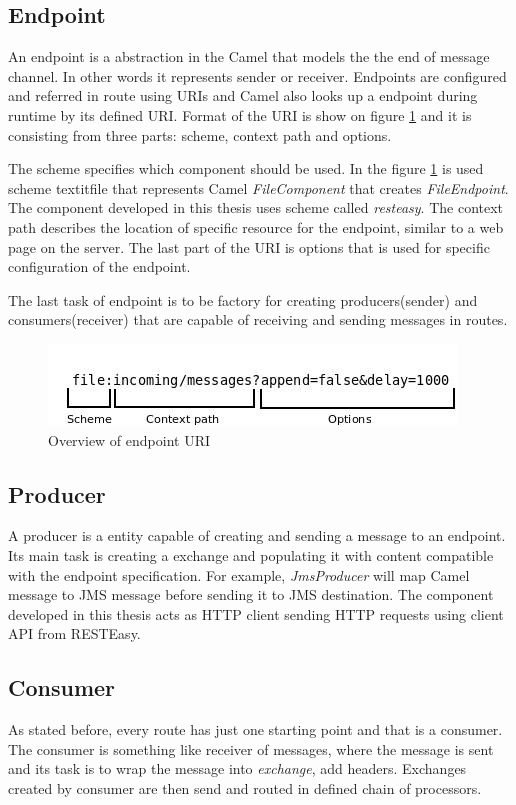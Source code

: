 \documentclass[12pt,final,oneside]{fithesis2}
\begin{document}
\subsection*{Endpoint}
An endpoint is a abstraction in the Camel that models the the end of message channel. In other words it represents sender or receiver. Endpoints are configured and referred in route using URIs and Camel also looks up a endpoint during runtime by its defined URI. Format of the URI is show on figure \ref{uri} and it is consisting from three parts: scheme, context path and options. 

The scheme specifies which component should be used. In the figure \ref{uri} is used scheme textit{file} that represents Camel \textit{FileComponent} that creates \textit{FileEndpoint}. The component developed in this thesis uses scheme called \textit{resteasy}. The context path describes the location of specific resource for the endpoint, similar to a web page on the server. The last part of the URI is options that is used for specific configuration of the endpoint.

The last task of endpoint is to be factory for creating producers(sender) and consumers(receiver) that are capable of receiving and sending messages in routes.

\begin{figure}
\centering
\includegraphics[width=0.9\linewidth]{sources/Diagram1.jpeg}
\caption{Overview of endpoint URI}
\label{uri}
\end{figure}

\subsection*{Producer}
A producer is a entity capable of creating and sending a message to an endpoint. Its main task is creating a exchange and populating it with content compatible with the endpoint specification. For example, \textit{JmsProducer} will map Camel message to JMS message before sending it to JMS destination. The component developed in this thesis acts as HTTP client sending HTTP requests using client API from RESTEasy.


\subsection*{Consumer} 
As stated before, every route has just one starting point and that is a consumer. The consumer is something like receiver of messages, where the message is sent and its task is to wrap the message into \textit{exchange}, add headers. Exchanges created by consumer are then send and routed in defined chain of processors.
\end{document}
